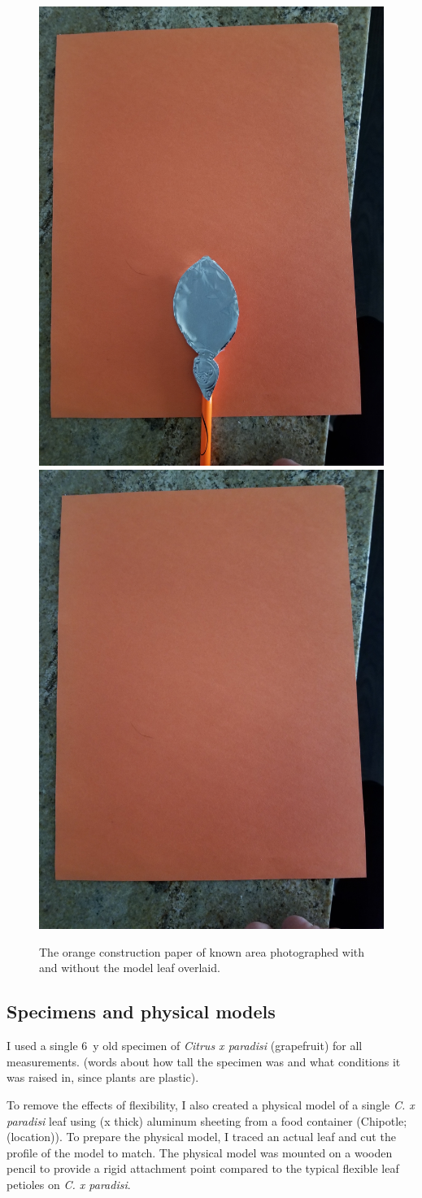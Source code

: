\documentclass{article}
\begin{document}
\begin{figure}
\begin{center}
\includegraphics[width=0.33\columnwidth]{MetalLeaf.jpg}
\includegraphics[width=0.33\columnwidth]{Paper.jpg}
\end{center}
\caption{The orange construction paper of known area photographed with and without the model leaf overlaid.}
\label{fig:methods4}
\end{figure}

\subsection{Specimens and physical models}
I used a single \SI{6}{y} old specimen of \emph{Citrus x paradisi} (grapefruit) for all measurements. (words about how tall the specimen was and what conditions it was raised in, since plants are plastic). 

To remove the effects of flexibility, I also created a physical model of a single \emph{C. x paradisi} leaf using (x thick) aluminum sheeting from a food container (Chipotle; (location)). To prepare the physical model, I traced an actual leaf and cut the profile of the model to match. The physical model was mounted on a wooden pencil to provide a rigid attachment point compared to the typical flexible leaf petioles on \emph{C. x paradisi}. 
\end{document}
